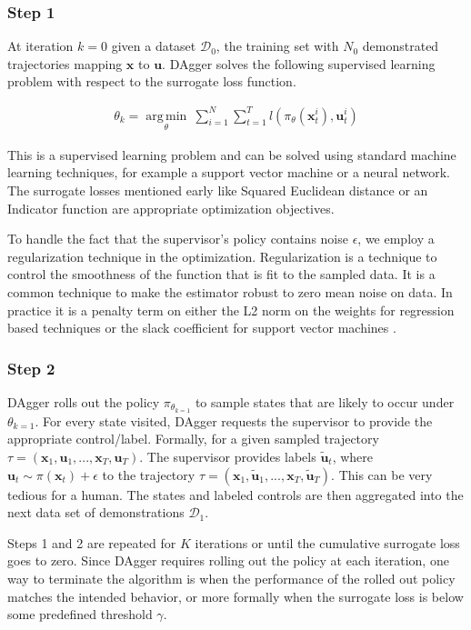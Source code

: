 \documentclass[10pt, conference]{ieeeconf}      %
\DeclareMathOperator*{\argmin}{arg\,min}
\newcommand{\bu}{\mathbf{u}}
\newcommand{\bx}{\mathbf{x}}
\begin{document}
\subsubsection{Step 1}
At iteration $k=0$ given a dataset $\mathcal{D}_0$, the training set with $N_0$ demonstrated trajectories mapping $\bx$ to $\bu$. DAgger solves the following supervised learning problem with respect to the surrogate loss function. 

 \vspace{-2ex}
\begin{align}\label{eq:super_objj}
\theta_{k} = \underset{\theta}{\argmin} \: \sum_{i=1}^{N}\sum_{t=1}^T l(\pi_{\theta}(\bx_t^{i}),\bu_{t}^i)
\end{align}
 
 
This is a supervised learning problem and can be solved using standard machine learning techniques, for example a support vector machine or a neural network. The surrogate losses mentioned early like Squared Euclidean distance or an Indicator function are appropriate optimization objectives. 
 
 To handle the fact that the supervisor's policy contains noise $\epsilon$, we employ a regularization technique in the optimization. Regularization is a technique to control the smoothness of the function that is fit to the sampled data. It is a common technique to make the estimator robust to zero mean noise on data. In practice it is a penalty term on either  the L2 norm on the weights for regression based techniques or the slack coefficient for support vector machines \cite{scholkopf2002learning}.
 
 \subsubsection{Step 2}
DAgger rolls out the policy $\pi_{\theta_{k=1}}$ to sample states that are likely to occur under $\theta_{k=1}$. For every state visited, DAgger requests the supervisor to provide the appropriate control/label. Formally, for a given sampled trajectory  $\tau = (\bx_1,\bu_1,...,\bx_T,\bu_T )$. The supervisor provides labels $\tilde{\bu}_t$, where $\bu_t \sim \pi(\bx_t) + \epsilon$ to the trajectory $\tau = (\bx_1,\tilde{\bu}_1,...,\bx_T, \tilde{\bu}_T )$.  This can be very tedious for a human. The states and labeled controls are then aggregated into the next data set of demonstrations $\mathcal{D}_1$. 


Steps 1 and 2 are repeated for $K$ iterations or until the cumulative surrogate loss  goes to zero. Since DAgger requires rolling out the policy at each iteration, one way to terminate the algorithm is when the performance of the rolled out policy matches the intended behavior, or more formally when the surrogate loss is below some predefined threshold $\gamma$.  
\end{document}
